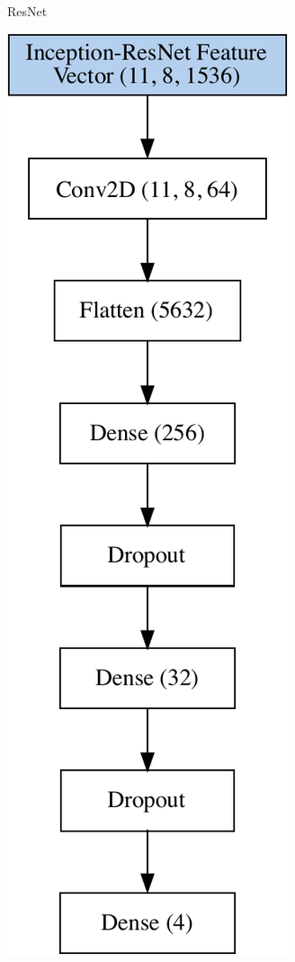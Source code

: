 \begin{figure}[h!]
\begin{subfigure}[b]{0.3\linewidth}
    \caption{ResNet} 
    \label{image-classification-model:resnet} 
    \vspace{2ex}
  \end{subfigure}%
   \begin{subfigure}[b]{0.3\linewidth}
    \centering
    \includegraphics[scale=0.6]{graphics/image-classification-results/model/inception.pdf} 

\end{subfigure}
\end{figure}
